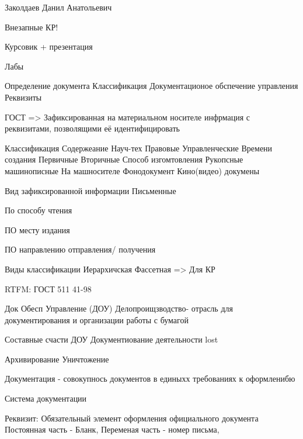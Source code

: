 \documentclass[a4paper,12pt]{report}
\begin{document}
	\def \nocredits {}
	\def \LineE {Конспект по дисциплине}
	\def \LineF {Защита и обработка конфиденциальных данных}

	\maketitle




	Заколдаев Данил Анатольевич

	Внезапные КР!

	Курсовик + презентация

	Лабы

	Определение документа
	Классификация
	Документационое обспечение управления
	Реквизиты

	 ГОСТ => Зафиксированная на материальном носителе инфрмация с реквизитами, позволящими её идентифицировать

	Классификация
		Содержеание
			Науч-тех
			Правовые
			Управленческие
		Времени создания
			Первичные
			Вторичные
		Способ изгомтовления
			Рукопсные
			машинописные
			На машносителе
			Фонодокумент
			Кино(видео) докумены

		Вид зафиксированной информации
			Письменные

		По способу чтения

		ПО месту издания

		ПО направлению отправления/ получения


		Виды классификации
			Иерархичская
			Фассетная => Для КР

		RTFM: ГОСТ 511 41-98

		Док Обесп Управление (ДОУ) Делопроищзводство- отрасль для документирования и организации работы с бумагой

		Составные счасти ДОУ
			Документиование деятельности
			lost

			Архивирование
			Уничтожение

			Документация - совокупнось документов в единыхх требованиях к оформленибю

			Система документации




		Реквизит:
			Обязательный элемент оформления официального документа
			Постоянная часть - Бланк,
			Переменая часть - номер письма,
\end{document}

